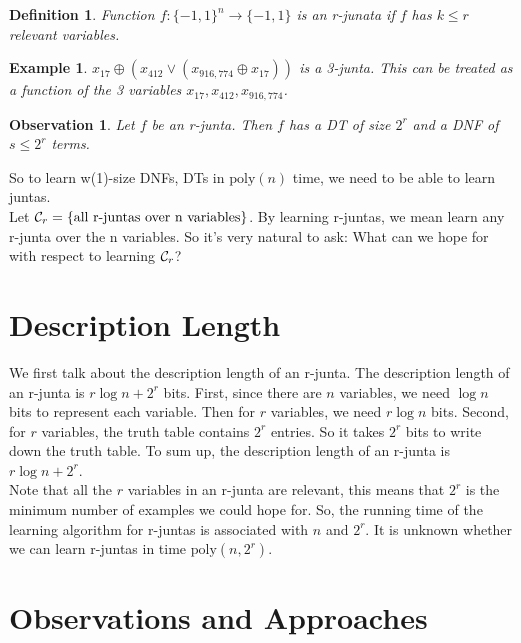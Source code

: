 \documentclass[12pt]{article}
\newtheorem{definition}[theorem]{Definition}
\newtheorem{observation}[theorem]{Observation}
\newtheorem{example}[theorem]{Example}
\newcommand{\calc}{{\cal C}}
\newcommand{\poly}{\mathrm{poly}}
\begin{document}
\begin{definition}
Function $f: \{ -1, 1 \}^n \rightarrow \{ -1,1 \}$ is an r-junata if
$f$ has $k \le r$ relevant variables.
\end{definition}

\begin{example}
$x_{17} \oplus (x_{412} \lor (x_{916,774} \oplus x_{17}))$ is a
3-junta. This can be treated as a function of the 3 variables $x_{17},
x_{412}, x_{916,774}$.
\end{example}

\begin{observation}
Let $f$ be an r-junta. Then $f$ has a DT of size $2^r$ and a DNF of $s
\le 2^r$ terms.
\end{observation}

So to learn w(1)-size DNFs, DTs in $\poly(n)$ time, we need to be able
to learn juntas. \\

Let $\calc_r = \{\text {all r-juntas over n variables} \}$. By
learning r-juntas, we mean learn any r-junta over the n variables. So
it's very natural to ask: What can we hope for with respect to
learning $\calc_r$? \\

\section{Description Length}

We first talk about the description length of an r-junta. The
description length of an r-junta is $r \log n + 2^r$ bits. First,
since there are $n$ variables, we need $\log n$ bits to represent each
variable. Then for $r$ variables, we need $r \log n$ bits. Second,
for $r$ variables, the truth table contains $2^r$ entries. So it takes
$2^r$ bits to write down the truth table.  To sum up, the description
length of an r-junta is $r \log n + 2^r$. \\

Note that all the $r$ variables in an r-junta are relevant, this means
that $2^r$ is the minimum number of examples we could hope for. So, the
running time of the learning algorithm for r-juntas is associated 
with $n$ and $2^r$. It is unknown whether we can learn r-juntas in
time $\poly (n, 2^r)$. \\

\section{Observations and Approaches}
\end{document}
